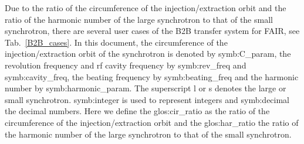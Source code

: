 Due to the ratio of the circumference of the injection/extraction orbit and the ratio of the harmonic number of the large synchrotron to that of the small synchrotron, there are several user cases of the B2B transfer system for FAIR, see Tab.~\ref{B2B_cases}. In this document, the circumference of the injection/extraction orbit of the synchrotron is denoted by \gls{symb:C_param}, the revolution frequency and rf cavity frequency by \gls{symb:rev_freq} and \gls{symb:cavity_freq}, the beating frequency by \gls{symb:beating_freq} and the harmonic number by \gls{symb:harmonic_param}. The superscript l or s denotes the large or small synchrotron. \gls{symb:integer} is used to represent integers and \gls{symb:decimal} the decimal numbers. Here we define the \gls{glos:cir_ratio} as the ratio of the circumference of the injection/extraction orbit and the \gls{glos:har_ratio} the ratio of the harmonic number of the large synchrotron to that of the small synchrotron.
